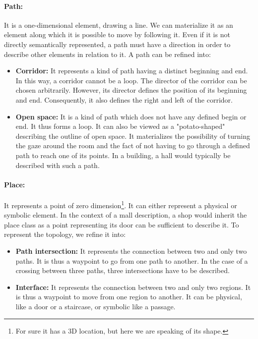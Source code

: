 \paragraph{Path:} It is a one-dimensional element, drawing a line. We can materialize it as an element along which it is possible to move by following it. Even if it is not directly semantically represented, a path must have a direction in order to describe other elements in relation to it. A path can be refined into:

\begin{itemize}
  \item \textbf{Corridor:} It represents a kind of path having a distinct beginning and end. In this way, a corridor cannot be a loop. The director of the corridor can be chosen arbitrarily. However, its director defines the position of its beginning and end. Consequently, it also defines the right and left of the corridor. 
  \item \textbf{Open space:} It is a kind of path which does not have any defined begin or end. It thus forms a loop. It can also be viewed as a "potato-shaped" describing the outline of open space. It materializes the possibility of turning the gaze around the room and the fact of not having to go through a defined path to reach one of its points. In a building, a hall would typically be described with such a path.
\end{itemize}

\paragraph{Place:} It represents a point of zero dimension\footnote{For sure it has a 3D location, but here we are speaking of its shape.}. It can either represent a physical or symbolic element. In the context of a mall description, a shop would inherit the place class as a point representing its door can be sufficient to describe it. To represent the topology, we refine it into:
  
\begin{itemize}
  \item \textbf{Path intersection:} It represents the connection between two and only two paths. It is thus a waypoint to go from one path to another. In the case of a crossing between three paths, three intersections have to be described.
  \item \textbf{Interface:} It represents the connection between two and only two regions. It is thus a waypoint to move from one region to another. It can be physical, like a door or a staircase, or symbolic like a passage.
\end{itemize}

